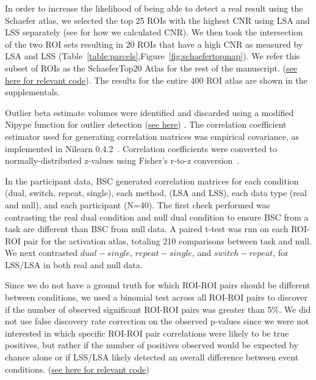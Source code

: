 \documentclass[phd,figures,tables,ackpage,abstractpage,publicabstractpage]{uithesis}
\begin{document}
In order to increase the likelihood of being able to detect a real result using the Schaefer atlas,
we selected the top 25 ROIs with the highest CNR using LSA and LSS separately
(see  for how we calculated CNR).
We then took the intersection of the two ROI sets resulting in 20 ROIs that have a high CNR
as measured by LSA and LSS (Table~\ref{table:parcels},Figure~\ref{fig:schaefertopmap}).
We refer this subset of ROIs as the SchaeferTop20 Atlas for the rest of the manuscript.
(\href{https://github.com/jdkent/BetaSeriesRealDataAnalysis/blob/b18b44321edf7b662a1e5ea635f64452c8d3644c/nibsAnalysis/cnr_trial_variability.ipynb}{see here for relevant code}).
The results for the entire 400 ROI atlas are shown in the supplementals.

Outlier beta estimate volumes were identified and discarded using a
modified Nipype function for outlier detection
(\href{https://github.com/HBClab/NiBetaSeries/blob/a45c0a1f/src/nibetaseries/interfaces/nilearn.py#L153}{see here}) \cite{Crosby1994}.
The correlation coefficient estimator used for generating correlation matrices
was empirical covariance, as implemented in Nilearn 0.4.2~\cite{Abraham2014}.
Correlation coefficients were converted to normally-distributed z-values using
Fisher's r-to-z conversion~\cite{Fisher1915}.

In the participant data, BSC generated correlation matrices for each condition (dual, switch, repeat, single),
each method, (LSA and LSS), each data type (real and null), and each participant (N=40).
The first check performed was contrasting the real dual condition and null dual condition
to ensure BSC from a task are different than BSC from null data.
A paired t-test was run on each ROI-ROI pair for the activation atlas, totaling 210 comparisons
between task and null.
We next contrasted $dual - single$, $repeat - single$, and $switch - repeat$, for LSS/LSA in both
real and null data.

Since we do not have a ground truth for which ROI-ROI pairs should be different between conditions,
we used a binomial test across all ROI-ROI pairs to discover if the number of observed significant ROI-ROI pairs was greater
than 5\%.
We did not use false discovery rate correction on the observed p-values since we were not interested in
which specific ROI-ROI pair correlations were likely to be true positives, but rather if the number of positives
observed would be expected by chance alone or if LSS/LSA likely detected an overall difference between event conditions.
(\href{https://github.com/jdkent/BetaSeriesRealDataAnalysis/blob/b18b44321edf7b662a1e5ea635f64452c8d3644c/nibsAnalysis/beta_series_analysis.ipynb}{see here for relevant code})
\end{document}
